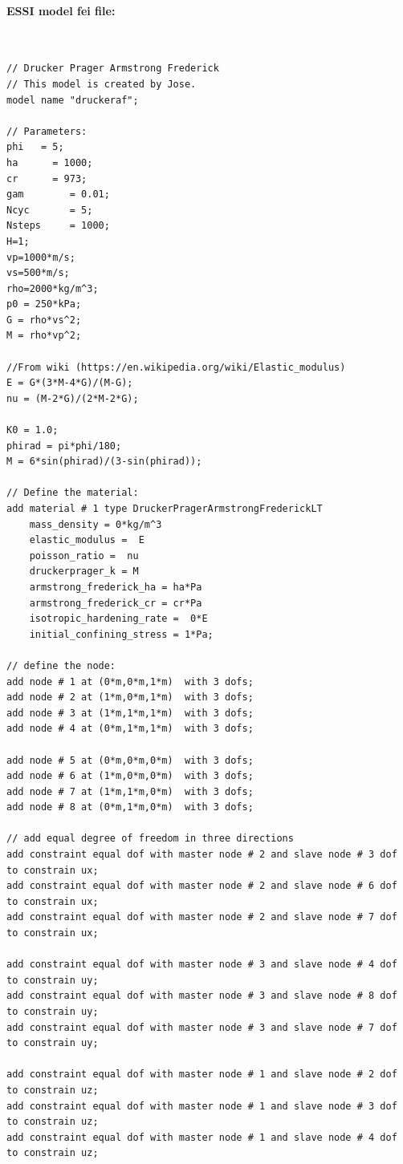 \documentclass[fleqn,11pt]{article}
\begin{document}
\paragraph{ESSI model fei file: } ~

%

\begin{lstlisting}
// Drucker Prager Armstrong Frederick
// This model is created by Jose.
model name "druckeraf";

// Parameters:
phi   = 5;
ha      = 1000;
cr      = 973;
gam        = 0.01;
Ncyc       = 5;
Nsteps     = 1000;
H=1;
vp=1000*m/s;
vs=500*m/s; 
rho=2000*kg/m^3;
p0 = 250*kPa;
G = rho*vs^2;
M = rho*vp^2;

//From wiki (https://en.wikipedia.org/wiki/Elastic_modulus)
E = G*(3*M-4*G)/(M-G);
nu = (M-2*G)/(2*M-2*G);

K0 = 1.0;
phirad = pi*phi/180;
M = 6*sin(phirad)/(3-sin(phirad));

// Define the material:
add material # 1 type DruckerPragerArmstrongFrederickLT
    mass_density = 0*kg/m^3 
    elastic_modulus =  E
    poisson_ratio =  nu
    druckerprager_k = M
    armstrong_frederick_ha = ha*Pa 
    armstrong_frederick_cr = cr*Pa
    isotropic_hardening_rate =  0*E
    initial_confining_stress = 1*Pa;

// define the node:
add node # 1 at (0*m,0*m,1*m)  with 3 dofs;
add node # 2 at (1*m,0*m,1*m)  with 3 dofs;
add node # 3 at (1*m,1*m,1*m)  with 3 dofs;
add node # 4 at (0*m,1*m,1*m)  with 3 dofs;

add node # 5 at (0*m,0*m,0*m)  with 3 dofs;
add node # 6 at (1*m,0*m,0*m)  with 3 dofs;
add node # 7 at (1*m,1*m,0*m)  with 3 dofs;
add node # 8 at (0*m,1*m,0*m)  with 3 dofs;

// add equal degree of freedom in three directions
add constraint equal dof with master node # 2 and slave node # 3 dof to constrain ux;
add constraint equal dof with master node # 2 and slave node # 6 dof to constrain ux;
add constraint equal dof with master node # 2 and slave node # 7 dof to constrain ux;

add constraint equal dof with master node # 3 and slave node # 4 dof to constrain uy;
add constraint equal dof with master node # 3 and slave node # 8 dof to constrain uy;
add constraint equal dof with master node # 3 and slave node # 7 dof to constrain uy;

add constraint equal dof with master node # 1 and slave node # 2 dof to constrain uz;
add constraint equal dof with master node # 1 and slave node # 3 dof to constrain uz;
add constraint equal dof with master node # 1 and slave node # 4 dof to constrain uz;


\end{lstlisting}
\end{document}
